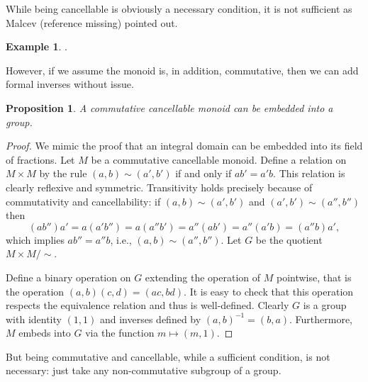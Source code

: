 \documentclass{article}
\theoremstyle{plain}
\newtheorem{prop}[thm]{Proposition}
\theoremstyle{definition}
\newtheorem{eg}[thm]{Example}
\begin{document}
	While being cancellable is obviously a necessary condition, it is not sufficient as Malcev (reference missing) pointed out. 
	\begin{eg}
		\color{red}{Give a simpler example than Malcev's}.
	\end{eg}
	However, if we assume the monoid is, in addition, commutative, then we can add formal inverses without issue.
	\begin{prop}
		A commutative cancellable monoid can be embedded into a group.
	\end{prop}
	\begin{proof}
		We mimic the proof that an integral domain can be embedded into its field of fractions. Let $M$ be a commutative cancellable monoid. Define a relation on $M\times M$ by the rule $(a,b)\sim (a',b')$ if and only if $ab' = a'b$. This relation is clearly reflexive and symmetric. Transitivity holds precisely because of commutativity and cancellability: if $(a,b)\sim (a',b')$ and $(a',b')\sim (a'',b'')$ then
		\begin{equation*}
			(ab'')a' = a(a'b'')
			= a(a''b')
			= a''(ab')
			= a''(a'b)
			= (a''b)a',
		\end{equation*}
		which implies $ab'' = a''b$, i.e., $(a,b)\sim (a'',b'')$. Let $G$ be the quotient $M\times M / \sim$. 
		
		Define a binary operation on $G$ extending the operation of $M$ pointwise, that is the operation $(a,b)(c,d) = (ac,bd)$. It is easy to check that this operation respects the equivalence relation and thus is well-defined. Clearly $G$ is a group with identity $(1,1)$ and inverses defined by $(a,b)^{-1} = (b,a)$. Furthermore, $M$ embeds into $G$ via the function $m\mapsto (m,1)$.
	\end{proof}
	But being commutative and cancellable, while a sufficient condition, is not necessary: just take any non-commutative subgroup of a group.
	
\end{document}
